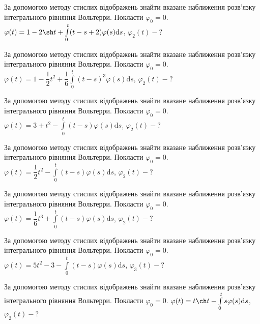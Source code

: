 \documentclass[12pt]{extarticle}
\begin{document}
\begin{Exercise}
За допомогою методу стислих відображень знайти вказане наближення розв’язку інтегрального рівняння Вольтерри. Покласти $\varphi_0=0$. $\varphi(t) = 1 - 2\sh t + \int\limits_{0}^{t} (t-s+2)\varphi(s) \mathrm{d}s$, $\varphi_2(t) - ?$
\end{Exercise}

\begin{Exercise}
За допомогою методу стислих відображень знайти вказане наближення розв’язку інтегрального рівняння Вольтерри. Покласти $\varphi_0=0$. $\varphi(t) = 1 - \dfrac{1}{2}t^2 + \dfrac{1}{6}\int\limits_{0}^{t} (t-s)^3 \varphi(s) \mathrm{d}s$, $\varphi_2(t) - ?$
\end{Exercise}

\begin{Exercise}
За допомогою методу стислих відображень знайти вказане наближення розв’язку інтегрального рівняння Вольтерри. Покласти $\varphi_0=0$. $\varphi(t) = 3 + t^2 - \int\limits_{0}^{t} (t-s)\varphi(s) \mathrm{d}s$, $\varphi_2(t) - ?$
\end{Exercise}

\begin{Exercise}
За допомогою методу стислих відображень знайти вказане наближення розв’язку інтегрального рівняння Вольтерри. Покласти $\varphi_0=0$. $\varphi(t) = \dfrac{1}{2}t^2 - \int\limits_{0}^{t} (t-s)\varphi(s) \mathrm{d}s$, $\varphi_2(t) - ?$
\end{Exercise}

\begin{Exercise}
За допомогою методу стислих відображень знайти вказане наближення розв’язку інтегрального рівняння Вольтерри. Покласти $\varphi_0=0$. $\varphi(t) = \dfrac{1}{6}t^3 + \int\limits_{0}^{t} (t-s) \varphi(s) \mathrm{d}s$, $\varphi_2(t) - ?$
\end{Exercise}

\begin{Exercise}
За допомогою методу стислих відображень знайти вказане наближення розв’язку інтегрального рівняння Вольтерри. Покласти $\varphi_0=0$. $\varphi(t) = 5 t^2 -3 - \int\limits_{0}^{t} (t-s) \varphi(s) \mathrm{d}s$, $\varphi_3(t) - ?$
\end{Exercise}

\begin{Exercise}
За допомогою методу стислих відображень знайти вказане наближення розв’язку інтегрального рівняння Вольтерри. Покласти $\varphi_0=0$. $\varphi(t) = t \ch t - \int\limits_{0}^{t} s\varphi(s) \mathrm{d}s$, $\varphi_2(t) - ?$
\end{Exercise}
\end{document}
